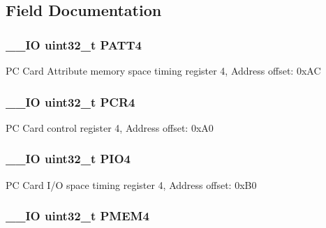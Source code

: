 \subsection{Field Documentation}
\hypertarget{struct_f_s_m_c___bank4___type_def_a955cad1aab7fb2d5b6e216cb29b5e7e2}{
\subsubsection[{P\-A\-T\-T4}]{\setlength{\rightskip}{0pt plus 5cm}\-\_\-\-\_\-\-I\-O uint32\-\_\-t P\-A\-T\-T4}}\label{struct_f_s_m_c___bank4___type_def_a955cad1aab7fb2d5b6e216cb29b5e7e2}
P\-C Card Attribute memory space timing register 4, Address offset\-: 0x\-A\-C \hypertarget{struct_f_s_m_c___bank4___type_def_a2f02e7acfbd7e549ede84633215eb6a1}{
\subsubsection[{P\-C\-R4}]{\setlength{\rightskip}{0pt plus 5cm}\-\_\-\-\_\-\-I\-O uint32\-\_\-t P\-C\-R4}}\label{struct_f_s_m_c___bank4___type_def_a2f02e7acfbd7e549ede84633215eb6a1}
P\-C Card control register 4, Address offset\-: 0x\-A0 \hypertarget{struct_f_s_m_c___bank4___type_def_ac53cd7a08093a4ae8f4de4bcff67a64f}{
\subsubsection[{P\-I\-O4}]{\setlength{\rightskip}{0pt plus 5cm}\-\_\-\-\_\-\-I\-O uint32\-\_\-t P\-I\-O4}}\label{struct_f_s_m_c___bank4___type_def_ac53cd7a08093a4ae8f4de4bcff67a64f}
P\-C Card I/\-O space timing register 4, Address offset\-: 0x\-B0 \hypertarget{struct_f_s_m_c___bank4___type_def_a3f82cc749845fb0dd7dfa8121d96b663}{
\subsubsection[{P\-M\-E\-M4}]{\setlength{\rightskip}{0pt plus 5cm}\-\_\-\-\_\-\-I\-O uint32\-\_\-t P\-M\-E\-M4}}\label{struct_f_s_m_c___bank4___type_def_a3f82cc749845fb0dd7dfa8121d96b663}
